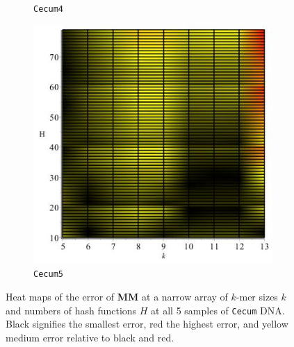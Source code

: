\documentclass[../../main.tex]{subfiles}
\begin{document}
\begin{figure}[H]
\begin{subfigure}[b]{.5\textwidth}
\caption{\texttt{Cecum4}}
\end{subfigure}
\begin{subfigure}[b]{.5\textwidth}
\includegraphics[width=\textwidth]{precision/minmax/cecum5precise}
\caption{\texttt{Cecum5}}
\end{subfigure}
\caption{Heat maps of the error of {\bf MM} at a narrow array of $k$-mer sizes $k$ and numbers of hash functions $H$ at all 5 samples of \texttt{Cecum} DNA. Black signifies the smallest error, red the highest error, and yellow medium error relative to black and red.}\label{fig:Cpreciseminmax}
\end{figure}
\end{document}
